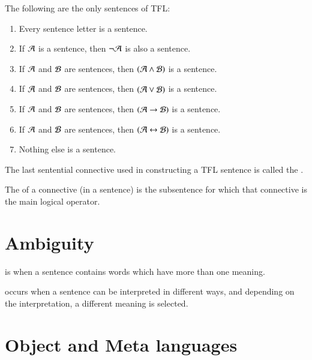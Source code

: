 \documentclass[12pt, a4paper, oneside, openright, titlepage]{book}
\begin{document}
\begin{defn}
    The following are the only sentences of TFL:
    \begin{enumerate}
        \item Every sentence letter is a sentence.
        \item If $\mathcal{A}$ is a sentence, then $\lnot \mathcal{A}$ is also a sentence.
        \item If $\mathcal{A}$ and $\mathcal{B}$ are sentences, then $(\mathcal{A}\wedge \mathcal{B})$ is a sentence.
        \item If $\mathcal{A}$ and $\mathcal{B}$ are sentences, then $(\mathcal{A}\lor \mathcal{B})$ is a sentence.
        \item If $\mathcal{A}$ and $\mathcal{B}$ are sentences, then $(\mathcal{A}\rightarrow \mathcal{B})$ is a sentence.
        \item If $\mathcal{A}$ and $\mathcal{B}$ are sentences, then $(\mathcal{A}\leftrightarrow \mathcal{B})$ is a sentence.
        \item Nothing else is a sentence.
    \end{enumerate}
    The last sentential connective used in constructing a TFL sentence is called the .
\end{defn}


\begin{defn}
    The  of a connective (in a sentence) is the subsentence for which that connective is the main logical operator.
\end{defn}




\section{\textsection Ambiguity}

\begin{defn}
     is when a sentence contains words which have more than one meaning.
\end{defn}

\begin{defn}
     occurs when a sentence can be interpreted in different ways, and depending on the interpretation, a different meaning is selected.
\end{defn}


\section{\textsection Object and Meta languages}
\end{document}
